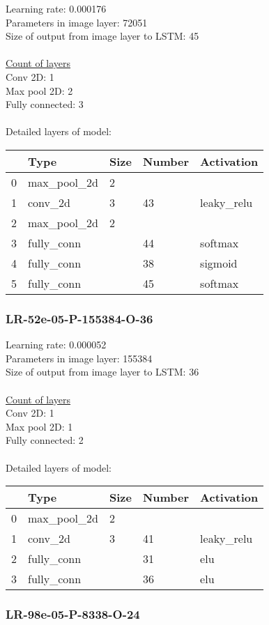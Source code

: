 Learning rate: 0.000176
\\Parameters in image layer: 72051
\\Size of output from image layer to LSTM: 45
\\\\\underline{Count of layers} 
\\Conv 2D:           1\\Max pool 2D:      2\\Fully connected:  3
\\\\Detailed layers of model: \\\begin{tabular}{rllll}
\hline
    & Type        & Size   & Number   & Activation   \\
\hline
  0 & max\_pool\_2d & 2      &          &              \\
  1 & conv\_2d     & 3      & 43       & leaky\_relu   \\
  2 & max\_pool\_2d & 2      &          &              \\
  3 & fully\_conn  &        & 44       & softmax      \\
  4 & fully\_conn  &        & 38       & sigmoid      \\
  5 & fully\_conn  &        & 45       & softmax      \\
\hline
\end{tabular}\subsubsection*{LR-52e-05-P-155384-O-36}
Learning rate: 0.000052
\\Parameters in image layer: 155384
\\Size of output from image layer to LSTM: 36
\\\\\underline{Count of layers} 
\\Conv 2D:           1\\Max pool 2D:      1\\Fully connected:  2
\\\\Detailed layers of model: \\\begin{tabular}{rllll}
\hline
    & Type        & Size   & Number   & Activation   \\
\hline
  0 & max\_pool\_2d & 2      &          &              \\
  1 & conv\_2d     & 3      & 41       & leaky\_relu   \\
  2 & fully\_conn  &        & 31       & elu          \\
  3 & fully\_conn  &        & 36       & elu          \\
\hline
\end{tabular}\subsubsection*{LR-98e-05-P-8338-O-24}

